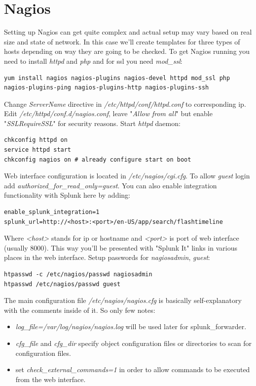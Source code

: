 \documentclass[10pt,a4paper,final]{report}
\begin{document}
\chapter{Nagios}

Setting up Nagios can get quite complex and actual setup may vary based on real size and state of network. In this case we'll create templates for three types of hosts depending on way they are going to be checked. To get Nagios running you need to install \emph{httpd} and \emph{php} and for ssl you need \emph{mod\_ssl}:
\begin{lstlisting}
yum install nagios nagios-plugins nagios-devel httpd mod_ssl php nagios-plugins-ping nagios-plugins-http nagios-plugins-ssh
\end{lstlisting}
Change \emph{ServerName} directive in \emph{/etc/httpd/conf/httpd.conf} to corresponding ip.
Edit \emph{/etc/httpd/conf.d/nagios.conf}, leave "\emph{Allow from all}" but enable "\emph{SSLRequireSSL}" for security reasons. Start \emph{httpd} daemon:
\begin{lstlisting}
chkconfig httpd on
service httpd start
chkconfig nagios on # already configure start on boot
\end{lstlisting}
Web interface configuration is located in \emph{/etc/nagios/cgi.cfg}. To allow \emph{guest} login add \emph{authorized\_for\_read\_only=guest}. You can also enable integration functionality with Splunk here by adding:
\begin{lstlisting}
enable_splunk_integration=1
splunk_url=http://<host>:<port>/en-US/app/search/flashtimeline
\end{lstlisting}
Where \emph{<host>} stands for ip or hostname and \emph{<port>} is port of web interface (usually 8000). This way you'll be presented with "Splunk It" links in various places in the web interface.
\newline Setup passwords for \emph{nagiosadmin}, \emph{guest}:
\begin{lstlisting}
htpasswd -c /etc/nagios/passwd nagiosadmin 
htpasswd /etc/nagios/passwd guest
\end{lstlisting}
The main configuration file \emph{/etc/nagios/nagios.cfg} is basically self-explanatory with the comments inside of it. So only few notes: 
\begin{itemize}
\item \emph{log\_file=/var/log/nagios/nagios.log} will be used later for splunk\_forwarder.
\item \emph{cfg\_file} and \emph{cfg\_dir} specify object configuration files or directories to scan for configuration files.
\item set \emph{check\_external\_commands=1} in order to allow commands to be executed from the web interface.
\end{itemize}
\end{document}
